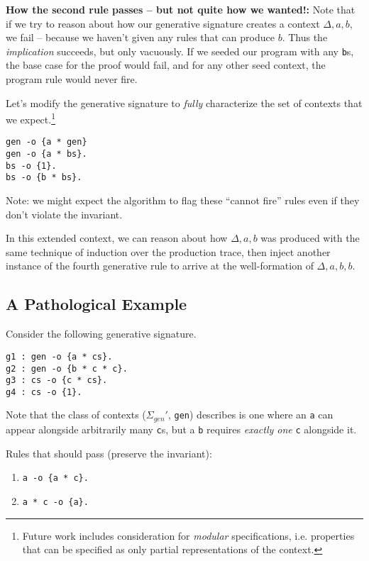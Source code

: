 \documentclass[fullpage, 11pt]{article}
\begin{document}
{\bf How the second rule passes -- but not quite how we wanted!:} Note that
if we try to reason about how our generative signature creates a context
$\Delta, a, b$, we fail -- because we haven't given any rules that can
produce $b$. Thus the {\em implication} succeeds, but only vacuously. If we
seeded our program with any \verb|b|s, the base case for the proof would
fail, and for any other seed context, the program rule would never fire.

Let's modify the generative signature to {\em fully} characterize the set
of contexts that we expect.\footnote{Future work includes consideration for
{\em modular} specifications, i.e. properties that can be specified as only
partial representations of the context.}

\begin{verbatim}
gen -o {a * gen}
gen -o {a * bs}.
bs -o {1}.
bs -o {b * bs}.
\end{verbatim}

Note: we might expect the algorithm to flag these ``cannot fire'' rules
even if they don't violate the invariant.

In this extended context, we can reason about how $\Delta, a, b$ was
produced with the same technique of induction over the production trace,
then inject another instance of the fourth generative rule to arrive at the
well-formation of $\Delta, a, b, b$.

\subsection{A Pathological Example}

Consider the following generative signature.

\begin{verbatim}
g1 : gen -o {a * cs}.
g2 : gen -o {b * c * c}.
g3 : cs -o {c * cs}.
g4 : cs -o {1}.
\end{verbatim}

Note that the class of contexts ($\Sigma_{gen}'$, \verb|gen|) describes is
one where an \verb|a| can appear alongside arbitrarily many \verb|c|s, but
a \verb|b| requires {\em exactly one} \verb|c| alongside it.


Rules that should pass (preserve the invariant):
\begin{enumerate}
\item \verb|a -o {a * c}.|
\item \verb|a * c -o {a}.|
\end{enumerate}
\end{document}
